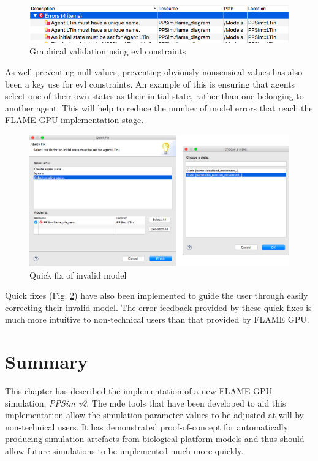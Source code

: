 \documentclass{UoYCSproject}
\begin{document}
\begin{figure}[htp]
\centering
\includegraphics[width=\textwidth]{Appendix/validation_gmf}
\caption{Graphical validation using \gls{evl} constraints}
\label{fig:validation_gmf}
\end{figure}

As well preventing null values, preventing obviously nonsensical values has also been a key use for \gls{evl} constraints.
An example of this is ensuring that agents select one of their own states as their initial state, rather than one belonging to another agent.
This will help to reduce the number of model errors that reach the \gls{FLAME GPU} implementation stage.


\begin{figure}[htp]
\centering
\includegraphics[width=\textwidth]{Appendix/validation_quickfix_gmf}
\caption{Quick fix of invalid model}
\label{fig:validation_quickfix_gmf}
\end{figure}

Quick fixes (Fig. \ref{fig:validation_quickfix_gmf}) have also been implemented to guide the user through easily correcting their invalid model.
The error feedback provided by these quick fixes is much more intuitive to non-technical users than that provided by \gls{FLAME GPU}.

\section{Summary}
This chapter has described the implementation of a new \gls{FLAME GPU} simulation, \textit{PPSim v2}.
The \gls{mde} tools that have been developed to aid this implementation allow the simulation parameter values to be adjusted at will by non-technical users.
It has demonstrated proof-of-concept for automatically producing simulation artefacts from biological platform models and thus should allow future simulations to be implemented much more quickly.
\end{document}
